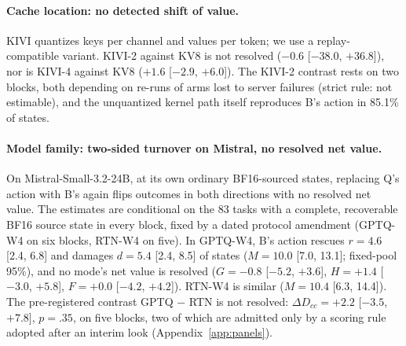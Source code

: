 \paragraph{Cache location: no detected shift of value.} KIVI \citep{liu2024kivi} quantizes keys per channel and values per token; we use a replay-compatible variant. KIVI-2 against KV8 is not resolved ($-0.6$ [$-38.0$, $+36.8$]\pp{}), nor is KIVI-4 against KV8 ($+1.6$ [$-2.9$, $+6.0$]\pp{}). The KIVI-2 contrast rests on two blocks, both depending on re-runs of arms lost to server failures (strict rule: not estimable), and the unquantized kernel path itself reproduces B's action in 85.1\% of states. %

\paragraph{Model family: two-sided turnover on Mistral, no resolved net value.} On Mistral-Small-3.2-24B, at its own ordinary BF16-sourced states, replacing Q's action with B's again flips outcomes in both directions with no resolved net value. The estimates are conditional on the 83 tasks with a complete, recoverable BF16 source state in every block, fixed by a dated protocol amendment (GPTQ-W4 on six blocks, RTN-W4 on five). In GPTQ-W4, B's action rescues $r=4.6$ [2.4, 6.8] and damages $d=5.4$ [2.4, 8.5]\pp{} of states ($M=10.0$ [7.0, 13.1]; fixed-pool 95\%), and no mode's net value is resolved ($G=-0.8$ [$-5.2$, $+3.6$], $H=+1.4$ [$-3.0$, $+5.8$], $F=+0.0$ [$-4.2$, $+4.2$]). RTN-W4 is similar ($M=10.4$ [6.3, 14.4]). The pre-registered contrast GPTQ $-$ RTN is not resolved: $\Delta D_{cc}=+2.2$ [$-3.5$, $+7.8$]\pp{}, $p=.35$, on five blocks, two of which are admitted only by a scoring rule adopted after an interim look (Appendix~\ref{app:panels}). %
